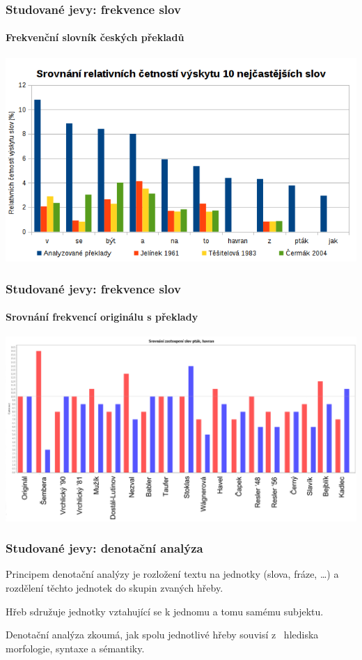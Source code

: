 \documentclass[12pt,xcolor=usenames,dvipsnames]{beamer}
\begin{document}
\begin{frame}
	\frametitle{Studované jevy: frekvence slov}
	\framesubtitle{Frekvenční slovník českých překladů}

	\vspace{-8.8pt}
	\begin{center}
		\includegraphics[width=\linewidth,height=0.86\textheight,keepaspectratio]{cetnost-slov}
	\end{center}

\end{frame}

\begin{frame}
	\frametitle{Studované jevy: frekvence slov}
	\framesubtitle{Srovnání frekvencí originálu s překlady}

	\begin{center}
		\includegraphics[width=\linewidth,height=0.86\textheight,keepaspectratio]{cetnost-slov-orig}
	\end{center}

\end{frame}

\begin{frame}
	\frametitle{Studované jevy: denotační analýza}

	Principem denotační analýzy je rozložení textu na jednotky (slova, fráze, …) a rozdělení těchto jednotek do skupin zvaných hřeby.

	Hřeb sdružuje jednotky vztahující se k jednomu a tomu samému subjektu.

	Denotační analýza zkoumá, jak spolu jednotlivé hřeby souvisí z~	hlediska morfologie, syntaxe a sémantiky.

\end{frame}
\end{document}
